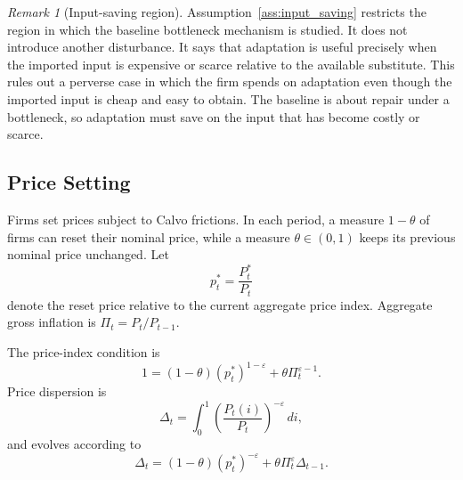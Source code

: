 ﻿\documentclass[12pt]{article}
\theoremstyle{remark}
\newtheorem{remark}{Remark}
\newcommand{\dd}{\,d}
\begin{document}
\begin{remark}[Input-saving region]
Assumption~\ref{ass:input_saving} restricts the region in which the baseline bottleneck mechanism
is studied. It does not introduce another disturbance. It says that adaptation is useful precisely
when the imported input is expensive or scarce relative to the available substitute. This rules out
a perverse case in which the firm spends on adaptation even though the imported input is cheap and
easy to obtain. The baseline is about repair under a bottleneck, so adaptation must save on the
input that has become costly or scarce.
\end{remark}

\subsection{Price Setting}

Firms set prices subject to Calvo frictions. In each period, a measure $1-\theta$ of firms can
reset their nominal price, while a measure $\theta\in(0,1)$ keeps its previous nominal price
unchanged. Let
\begin{equation}
    p_t^*=\frac{P_t^*}{P_t}
    \label{eq:reset_price_def}
\end{equation}
denote the reset price relative to the current aggregate price index. Aggregate gross inflation is
$\Pi_t=P_t/P_{t-1}$.

The price-index condition is
\begin{equation}
    1
    =
    (1-\theta)(p_t^*)^{1-\varepsilon}
    +
    \theta \Pi_t^{\varepsilon-1}.
    \label{eq:calvo_price_index}
\end{equation}
Price dispersion is
\begin{equation}
    \Delta_t
    =
    \int_0^1
    \left(\frac{P_t(i)}{P_t}\right)^{-\varepsilon}\dd i,
    \label{eq:price_dispersion_def}
\end{equation}
and evolves according to
\begin{equation}
    \Delta_t
    =
    (1-\theta)(p_t^*)^{-\varepsilon}
    +
    \theta \Pi_t^{\varepsilon}\Delta_{t-1}.
    \label{eq:price_dispersion_law}
\end{equation}
\end{document}

